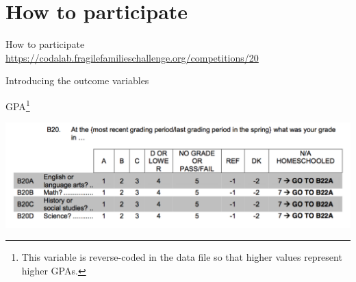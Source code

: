 \documentclass{beamer}
\begin{document}
\section{How to participate}
\begin{frame}

\large{
\begin{center}
How to participate\\
\textcolor{blue}{\href{https://codalab.fragilefamilieschallenge.org/competitions/20}{https://codalab.fragilefamilieschallenge.org/competitions/20}}
\end{center}
}

\end{frame}
\begin{frame}

\Large{
\begin{center}
Introducing the outcome variables
\end{center}
}

\end{frame}
\begin{frame}{GPA\footnote{This variable is reverse-coded in the data file so that higher values represent higher GPAs.}}

\centering
\includegraphics[width = .9\textwidth]{figures/GPA_questionnaire}

\end{frame}
\end{document}
